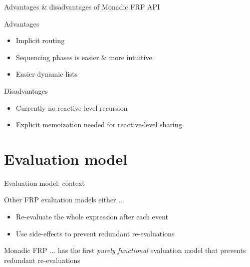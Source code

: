 \documentclass{beamer}
\begin{document}
\begin{frame}{Advantages \& disadvantages of Monadic FRP API}
\begin{block}{Advantages}
\begin{itemize}
\item Implicit routing
\item Sequencing phases is easier \& more intuitive.
\item Easier dynamic lists 
\end{itemize}
\end{block}
\begin{block}{Disadvantages}
\begin{itemize}
\item Currently no reactive-level recursion
\item Explicit memoization needed for reactive-level sharing
\end{itemize}
\end{block}
\end{frame}

\section{Evaluation model}
\begin{frame}{Evaluation model: context}
\begin{block}{Other FRP evaluation models either ...}
\begin{itemize}
\item Re-evaluate the whole expression after each event
\item Use side-effects to prevent redundant re-evaluations
\end{itemize}
\end{block}
\pause
\begin{block}{Monadic FRP ...}
has the first \emph{purely functional} evaluation model that prevents redundant re-evaluations
\end{block}
\end{frame}
\end{document}
